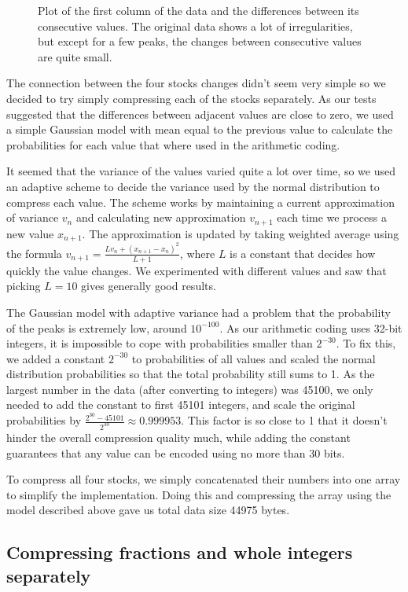 \documentclass{article}
\begin{document}
\begin{figure}
	\caption{Plot of the first column of the data and the differences between its consecutive values. The original data shows a lot of irregularities, but except for a few peaks, the changes between consecutive values are quite small.}
\end{figure}

The connection between the four stocks changes didn't seem very simple so we decided to try simply compressing each of the stocks separately.
As our tests suggested that the differences between adjacent values are close to zero, we used a simple Gaussian model with mean equal to the previous value to calculate the probabilities for each value that where used in the arithmetic coding.

It seemed that the variance of the values varied quite a lot over time, so we used an adaptive scheme to decide the variance used by the normal distribution to compress each value.
The scheme works by maintaining a current approximation of variance $v_n$ and calculating new approximation $v_{n+1}$ each time we process a new value $x_{n+1}$.
The approximation is updated by taking weighted average using the formula $v_{n+1} = \frac{Lv_n + (x_{n+1}-x_n)^2}{L+1}$, where $L$ is a constant that decides how quickly the value changes.
We experimented with different values and saw that picking $L=10$ gives generally good results.

The Gaussian model with adaptive variance had a problem that the probability of the peaks is extremely low, around $10^{-100}$.
As our arithmetic coding uses 32-bit integers, it is impossible to cope with probabilities smaller than $2^{-30}$.
To fix this, we added a constant $2^{-30}$ to probabilities of all values and scaled the normal distribution probabilities so that the total probability still sums to 1.
As the largest number in the data (after converting to integers) was 45100, we only needed to add the constant to first 45101 integers, and scale the original probabilities by $\frac{2^{30}-45101}{2^{30}} \approx 0.999953$.
This factor is so close to 1 that it doesn't hinder the overall compression quality much, while adding the constant guarantees that any value can be encoded using no more than 30 bits.

To compress all four stocks, we simply concatenated their numbers into one array to simplify the implementation.
Doing this and compressing the array using the model described above gave us total data size 44975 bytes.

\subsection{Compressing fractions and whole integers separately}
\end{document}
